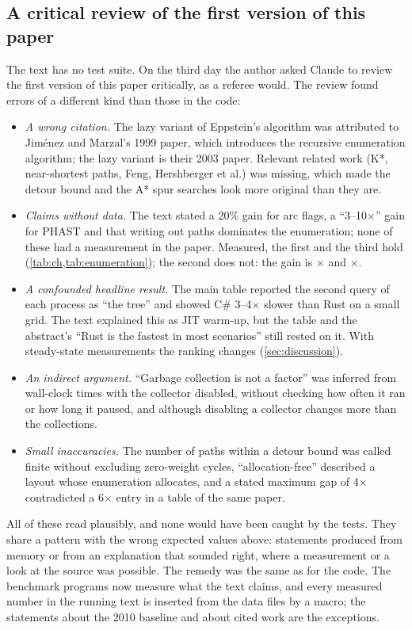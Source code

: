 \documentclass[11pt,a4paper]{article}
\newcommand{\cs}{C\#}
\begin{document}
\subsection{A critical review of the first version of this paper}
The text has no test suite. On the third day the author asked Claude to review the first version of this paper
critically, as a referee would. The review found errors of a different kind than those in the code:
\begin{itemize}
  \item \emph{A wrong citation.} The lazy variant of Eppstein's algorithm was attributed to Jiménez and Marzal's
        1999 paper, which introduces the recursive enumeration algorithm; the lazy variant is their 2003 paper.
        Relevant related work (K*, near-shortest paths, Feng, Hershberger et al.) was missing, which made the
        detour bound and the A* spur searches look more original than they are.
  \item \emph{Claims without data.} The text stated a 20\% gain for arc flags, a ``3--10$\times$'' gain for PHAST
        and that writing out paths dominates the enumeration; none of these had a measurement in the paper.
        Measured, the first and the third hold (\cref{tab:ch,tab:enumeration}); the second does not: the gain is
        \NumPhastSpeedupSmall$\times$ and \NumPhastSpeedupBig$\times$.
  \item \emph{A confounded headline result.} The main table reported the second query of each process as ``the
        tree'' and showed \cs{} 3--4$\times$ slower than Rust on a small grid. The text explained this as JIT
        warm-up, but the table and the abstract's ``Rust is the fastest in most scenarios'' still rested on it. With
        steady-state measurements the ranking changes (\cref{sec:discussion}).
  \item \emph{An indirect argument.} ``Garbage collection is not a factor'' was inferred from wall-clock times with
        the collector disabled, without checking how often it ran or how long it paused, and although disabling a
        collector changes more than the collections.
  \item \emph{Small inaccuracies.} The number of paths within a detour bound was called finite without excluding
        zero-weight cycles, ``allocation-free'' described a layout whose enumeration allocates, and a stated
        maximum gap of 4$\times$ contradicted a 6$\times$ entry in a table of the same paper.
\end{itemize}
All of these read plausibly, and none would have been caught by the tests. They share a pattern with the wrong
expected values above: statements produced from memory or from an explanation that sounded right, where a
measurement or a look at the source was possible. The remedy was the same as for the code. The benchmark programs
now measure what the text claims, and every measured number in the running text is inserted from the data files by
a macro; the statements about the 2010 baseline and about cited work are the exceptions.
\end{document}
